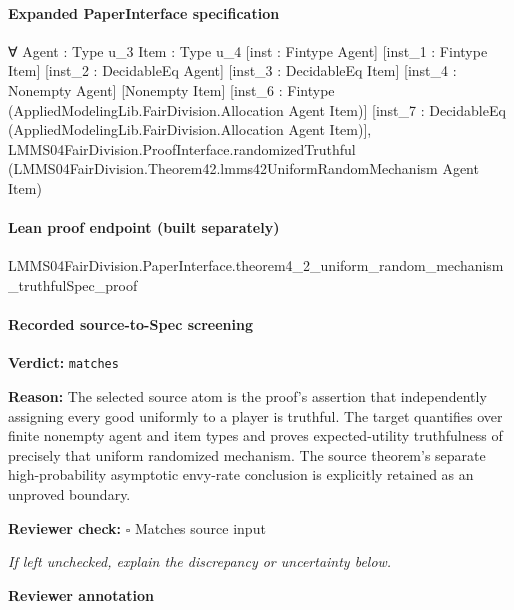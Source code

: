 \documentclass[10pt]{article}
\newcommand{\reviewerbox}{%
  \par\noindent\fbox{\parbox{0.96\linewidth}{\rule{0pt}{0.38in}}}\par
}
\newcommand{\reviewmatch}[1]{%
  \par\noindent\textbf{Reviewer check:} $\square$\; #1\par
  \noindent\emph{If left unchecked, explain the discrepancy or uncertainty below.}\par
}
\begin{document}
\paragraph{Expanded PaperInterface specification}
\begin{ReviewVerbatim}
∀ {Agent : Type u_3} {Item : Type u_4} [inst : Fintype Agent] [inst_1 : Fintype Item] [inst_2 : DecidableEq Agent]
  [inst_3 : DecidableEq Item] [inst_4 : Nonempty Agent] [Nonempty Item]
  [inst_6 : Fintype (AppliedModelingLib.FairDivision.Allocation Agent Item)]
  [inst_7 : DecidableEq (AppliedModelingLib.FairDivision.Allocation Agent Item)],
  LMMS04FairDivision.ProofInterface.randomizedTruthful
    (LMMS04FairDivision.Theorem42.lmms42UniformRandomMechanism Agent Item)
\end{ReviewVerbatim}



\paragraph{Lean proof endpoint (built separately)}\begin{ReviewVerbatim}
LMMS04FairDivision.PaperInterface.theorem4_2_uniform_random_mechanism_truthfulSpec_proof
\end{ReviewVerbatim}

\paragraph{Recorded source-to-Spec screening}
\textbf{Verdict:} \texttt{matches}
\\
{\raggedright
\textbf{Reason:} The selected source atom is the proof's assertion that independently assigning every good uniformly to a player is truthful.\allowbreak{} The target quantifies over finite nonempty agent and item types and proves expected-\allowbreak{}utility truthfulness of precisely that uniform randomized mechanism.\allowbreak{} The source theorem's separate high-\allowbreak{}probability asymptotic envy-\allowbreak{}rate conclusion is explicitly retained as an unproved boundary.\allowbreak{}
\par}
\reviewmatch{Matches source input}
\noindent\textbf{Reviewer annotation}\par
\reviewerbox
\end{document}
